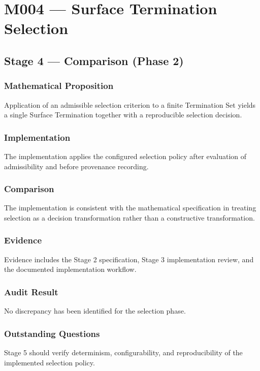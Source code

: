 \chapter{M004 --- Surface Termination Selection}

\section{Stage 4 --- Comparison (Phase 2)}

\subsection{Mathematical Proposition}

Application of an admissible selection criterion to a finite Termination
Set yields a single Surface Termination together with a reproducible
selection decision.

\subsection{Implementation}

The implementation applies the configured selection policy after
evaluation of admissibility and before provenance recording.

\subsection{Comparison}

The implementation is consistent with the mathematical specification in
treating selection as a decision transformation rather than a
constructive transformation.

\subsection{Evidence}

Evidence includes the Stage 2 specification, Stage 3 implementation
review, and the documented implementation workflow.

\subsection{Audit Result}

No discrepancy has been identified for the selection phase.

\subsection{Outstanding Questions}

Stage 5 should verify determinism, configurability, and reproducibility
of the implemented selection policy.

